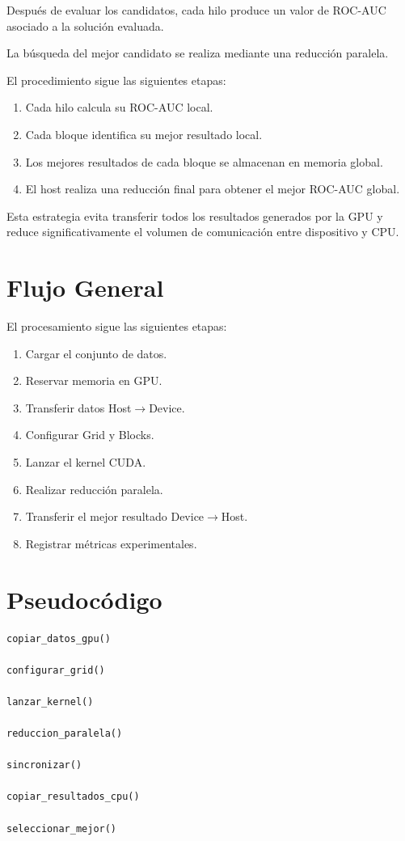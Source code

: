 Después de evaluar los candidatos, cada hilo produce un valor de ROC-AUC asociado a la solución evaluada.

La búsqueda del mejor candidato se realiza mediante una reducción paralela.

El procedimiento sigue las siguientes etapas:

\begin{enumerate}
    \item Cada hilo calcula su ROC-AUC local.
    \item Cada bloque identifica su mejor resultado local.
    \item Los mejores resultados de cada bloque se almacenan en memoria global.
    \item El host realiza una reducción final para obtener el mejor ROC-AUC global.
\end{enumerate}

Esta estrategia evita transferir todos los resultados generados por la GPU y reduce significativamente el volumen de comunicación entre dispositivo y CPU.

\section{Flujo General}

El procesamiento sigue las siguientes etapas:

\begin{enumerate}
    \item Cargar el conjunto de datos.
    \item Reservar memoria en GPU.
    \item Transferir datos Host$\rightarrow$Device.
    \item Configurar Grid y Blocks.
    \item Lanzar el kernel CUDA.
    \item Realizar reducción paralela.
    \item Transferir el mejor resultado Device$\rightarrow$Host.
    \item Registrar métricas experimentales.
\end{enumerate}

\section{Pseudocódigo}

\begin{lstlisting}[language=Python,
caption={Pseudocódigo general de la implementación CUDA},
label={lst:cuda_pseudocode}]
copiar_datos_gpu()

configurar_grid()

lanzar_kernel()

reduccion_paralela()

sincronizar()

copiar_resultados_cpu()

seleccionar_mejor()
\end{lstlisting}

